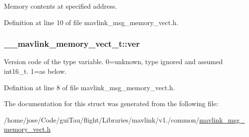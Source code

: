 Memory contents at specified address. 



Definition at line 10 of file mavlink\-\_\-msg\-\_\-memory\-\_\-vect.\-h.

\hypertarget{struct____mavlink__memory__vect__t_acb180cded1d3dcbf3e719545b50f392e}{
\subsubsection[{ver}]{ \-\_\-\-\_\-mavlink\-\_\-memory\-\_\-vect\-\_\-t\-::ver}}\label{struct____mavlink__memory__vect__t_acb180cded1d3dcbf3e719545b50f392e}


Version code of the type variable. 0=unknown, type ignored and assumed int16\-\_\-t. 1=as below. 



Definition at line 8 of file mavlink\-\_\-msg\-\_\-memory\-\_\-vect.\-h.



The documentation for this struct was generated from the following file\-:\begin{DoxyCompactItemize}
\item 
/home/jose/\-Code/gui\-Tau/flight/\-Libraries/mavlink/v1./common/\hyperlink{mavlink__msg__memory__vect_8h}{mavlink\-\_\-msg\-\_\-memory\-\_\-vect.\-h}\end{DoxyCompactItemize}
